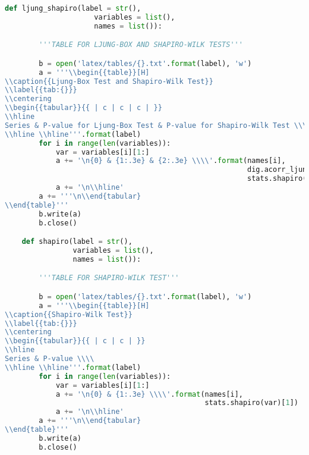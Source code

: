 \begin{lstlisting}[language=Python]
    def ljung_shapiro(label = str(),
                     variables = list(),
                     names = list()):

        '''TABLE FOR LJUNG-BOX AND SHAPIRO-WILK TESTS'''

        b = open('latex/tables/{}.txt'.format(label), 'w')
        a = '''\\begin{{table}}[H]
\\caption{{Ljung-Box Test and Shapiro-Wilk Test}}
\\label{{tab:{}}}
\\centering
\\begin{{tabular}}{{ | c | c | c | }}
\\hline
Series & P-value for Ljung-Box Test & P-value for Shapiro-Wilk Test \\\\
\\hline \\hline'''.format(label)
        for i in range(len(variables)):
            var = variables[i][1:]
            a += '\n{0} & {1:.3e} & {2:.3e} \\\\'.format(names[i],
                                                         dig.acorr_ljungbox(var)[1][39],
                                                         stats.shapiro(var)[1])
            a += '\n\\hline'
        a += '''\n\\end{tabular}
\\end{table}'''
        b.write(a)
        b.close()

    def shapiro(label = str(),
                variables = list(),
                names = list()):

        '''TABLE FOR SHAPIRO-WILK TEST'''

        b = open('latex/tables/{}.txt'.format(label), 'w')
        a = '''\\begin{{table}}[H]
\\caption{{Shapiro-Wilk Test}}
\\label{{tab:{}}}
\\centering
\\begin{{tabular}}{{ | c | c | }}
\\hline
Series & P-value \\\\
\\hline \\hline'''.format(label)
        for i in range(len(variables)):
            var = variables[i][1:]
            a += '\n{0} & {1:.3e} \\\\'.format(names[i],
                                               stats.shapiro(var)[1])
            a += '\n\\hline'
        a += '''\n\\end{tabular}
\\end{table}'''
        b.write(a)
        b.close()


\end{lstlisting}
